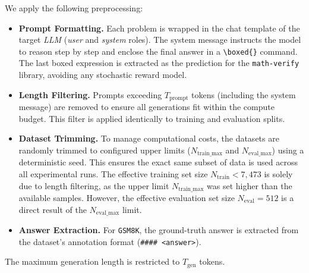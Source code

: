 \documentclass[a4paper,oneside,10pt,ngerman,english]{scrartcl}
\begin{document}
We apply the following preprocessing:
\begin{itemize}
	\item \textbf{Prompt Formatting.} Each problem is wrapped in the chat template of the target \textit{LLM} (\textit{user} and \textit{system} roles). The system message instructs the model to reason step by step and enclose the final answer in a \texttt{\textbackslash boxed\{\}} command. The last boxed expression is extracted as the prediction for the \texttt{math-verify} library, avoiding any stochastic reward model.
	\item \textbf{Length Filtering.} Prompts exceeding $T_{\mathrm{prompt}}$ tokens (including the system message) are removed to ensure all generations fit within the compute budget. This filter is applied identically to training and evaluation splits.
	\item \textbf{Dataset Trimming.} To manage computational costs, the datasets are randomly trimmed to configured upper limits ($N_{\mathrm{train\_max}}$ and $N_{\mathrm{eval\_max}}$) using a deterministic seed. This ensures the exact same subset of data is used across all experimental runs. The effective training set size $N_{\mathrm{train}} < 7{,}473$ is solely due to length filtering, as the upper limit $N_{\mathrm{train\_max}}$ was set higher than the available samples. However, the effective evaluation set size $N_{\mathrm{eval}} = 512$ is a direct result of the $N_{\mathrm{eval\_max}}$ limit.
	\item \textbf{Answer Extraction.} For \texttt{GSM8K}, the ground-truth answer is extracted from the dataset's annotation format (\texttt{\#\#\#\# <answer>}).
\end{itemize}
The maximum generation length is restricted to $T_{\mathrm{gen}}$ tokens.
\end{document}
